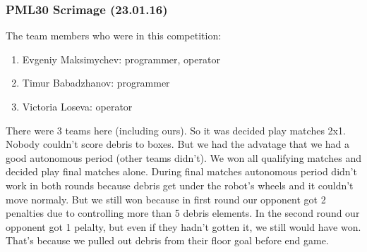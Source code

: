 \subsubsection{PML30 Scrimage (23.01.16)}
The team members who were in this competition:
\begin{enumerate}
	\item Evgeniy Maksimychev: programmer, operator 
	
	\item Timur Babadzhanov: programmer
	
	\item Victoria Loseva: operator
\end{enumerate}
There were 3 teams here (including ours). So it was decided play matches 2x1. Nobody couldn't score debris to boxes. But we had the advatage that we had a good autonomous period (other teams didn't).\newline
We won all qualifying matches and decided play final matches alone. During final matches autonomous period didn't work in both rounds because debris get under the robot's wheels and it couldn't move normaly. But we still won because in first round our opponent got 2 penalties due to controlling more than 5 debris elements. In the second round our opponent got 1 pelalty, but even if they hadn't gotten it, we still would have won. That's because we pulled out debris from their floor goal before end game.\newline
\fillpage
